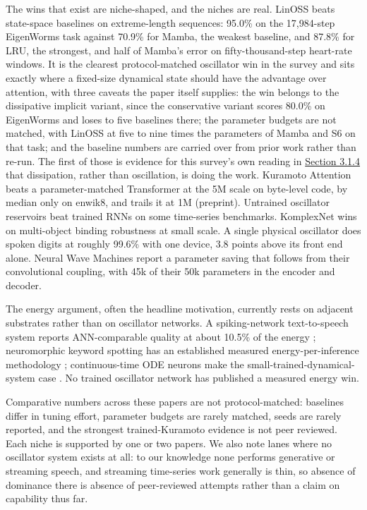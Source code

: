 \documentclass[a4paper,fleqn]{cas-sc}
\newcounter{none} %
\begin{document}
The wins that exist are niche-shaped, and the niches are real. LinOSS
beats state-space baselines on extreme-length sequences: 95.0\% on the
17,984-step EigenWorms task against 70.9\% for Mamba, the weakest
baseline, and 87.8\% for LRU, the strongest, and half of Mamba's error
on fifty-thousand-step heart-rate windows. It is the clearest
protocol-matched oscillator win in the survey and sits exactly where a
fixed-size dynamical state should have the advantage over attention,
with three caveats the paper itself supplies: the win belongs to the
dissipative implicit variant, since the conservative variant scores
80.0\% on EigenWorms and loses to five baselines there; the parameter
budgets are not matched, with LinOSS at five to nine times the
parameters of Mamba and S6 on that task; and the baseline numbers are
carried over from prior work rather than re-run. The first of those is
evidence for this survey's own reading in \hyperref[sec-3-1-4]{Section
3.1.4} that dissipation, rather than oscillation, is doing the work.
Kuramoto Attention beats a parameter-matched Transformer at the 5M scale
on byte-level code, by median only on enwik8, and trails it at 1M
(preprint). Untrained oscillator reservoirs beat trained RNNs on some
time-series benchmarks. KomplexNet wins on multi-object binding
robustness at small scale. A single physical oscillator does spoken
digits at roughly 99.6\% with one device, 3.8 points above its front end
alone. Neural Wave Machines report a parameter saving that follows from
their convolutional coupling, with 45k of their 50k parameters in the
encoder and decoder.

The energy argument, often the headline motivation, currently rests on
adjacent substrates rather than on oscillator networks. A
spiking-network text-to-speech system reports ANN-comparable quality at
about 10.5\% of the energy \citep{spikevoice}; neuromorphic keyword
spotting has an established measured energy-per-inference methodology
\citep{blouw2018}; continuous-time ODE neurons make the
small-trained-dynamical-system case \citep{ltc, cfc}. No trained
oscillator network has published a measured energy win.

Comparative numbers across these papers are not protocol-matched:
baselines differ in tuning effort, parameter budgets are rarely matched,
seeds are rarely reported, and the strongest trained-Kuramoto evidence
is not peer reviewed. Each niche is supported by one or two papers. We
also note lanes where no oscillator system exists at all: to our
knowledge none performs generative or streaming speech, and streaming
time-series work generally is thin, so absence of dominance there is
absence of peer-reviewed attempts rather than a claim on capability thus
far.
\end{document}
